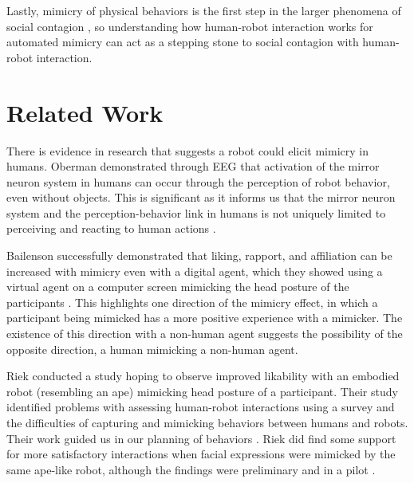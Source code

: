 \documentclass{acm_proc_article-sp}
\begin{document}
Lastly, mimicry of physical behaviors is the first step in the larger phenomena of social contagion \cite{chartrand2013antecedents}, so understanding how human-robot interaction works for automated mimicry can act as a stepping stone to social contagion with human-robot interaction.


\section{Related Work}
There is evidence in research that suggests a robot could elicit mimicry in humans. Oberman demonstrated through EEG that activation of the mirror neuron system in humans can occur through the perception of robot behavior, even without objects. This is significant as it informs us that the mirror neuron system and the perception-behavior link in humans is not uniquely limited to perceiving and reacting to human actions \cite{oberman2007eeg}. 

Bailenson successfully demonstrated that liking, rapport, and affiliation can be increased with mimicry even with a digital agent, which they showed using a virtual agent on a computer screen mimicking the head posture of the participants \cite{bailenson2005digital}. This highlights one direction of the mimicry effect, in which a participant being mimicked has a more positive experience with a mimicker. The existence of this direction with a non-human agent suggests the possibility of the opposite direction, a human mimicking a non-human agent. 

Riek conducted a study hoping to observe improved likability with an embodied robot (resembling an ape) mimicking head posture of a participant. Their study identified problems with assessing human-robot interactions using a survey and the difficulties of capturing and mimicking behaviors between humans and robots. Their work guided us in our planning of behaviors \cite{riek2010my}. Riek did find some support for more satisfactory interactions when facial expressions were mimicked by the same ape-like robot, although the findings were preliminary and in a pilot \cite{riek2008real}.
\end{document}

